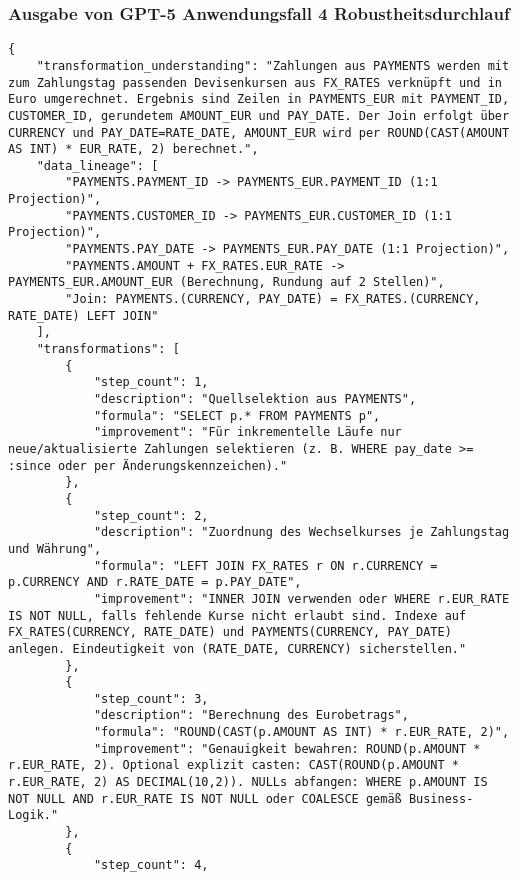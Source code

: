 \subsubsection{Ausgabe von GPT-5 Anwendungsfall 4 Robustheitsdurchlauf}\label{anhang:subsubsec:gpt_case4_prompt3}
\begin{lstlisting}[caption={Ausgabe: GPT-5 Anwendungsfall 4 Robustheitsdurchlauf},label={gpt_case4_prompt3}]
{
    "transformation_understanding": "Zahlungen aus PAYMENTS werden mit zum Zahlungstag passenden Devisenkursen aus FX_RATES verknüpft und in Euro umgerechnet. Ergebnis sind Zeilen in PAYMENTS_EUR mit PAYMENT_ID, CUSTOMER_ID, gerundetem AMOUNT_EUR und PAY_DATE. Der Join erfolgt über CURRENCY und PAY_DATE=RATE_DATE, AMOUNT_EUR wird per ROUND(CAST(AMOUNT AS INT) * EUR_RATE, 2) berechnet.",
    "data_lineage": [
        "PAYMENTS.PAYMENT_ID -> PAYMENTS_EUR.PAYMENT_ID (1:1 Projection)",
        "PAYMENTS.CUSTOMER_ID -> PAYMENTS_EUR.CUSTOMER_ID (1:1 Projection)",
        "PAYMENTS.PAY_DATE -> PAYMENTS_EUR.PAY_DATE (1:1 Projection)",
        "PAYMENTS.AMOUNT + FX_RATES.EUR_RATE -> PAYMENTS_EUR.AMOUNT_EUR (Berechnung, Rundung auf 2 Stellen)",
        "Join: PAYMENTS.(CURRENCY, PAY_DATE) = FX_RATES.(CURRENCY, RATE_DATE) LEFT JOIN"
    ],
    "transformations": [
        {
            "step_count": 1,
            "description": "Quellselektion aus PAYMENTS",
            "formula": "SELECT p.* FROM PAYMENTS p",
            "improvement": "Für inkrementelle Läufe nur neue/aktualisierte Zahlungen selektieren (z. B. WHERE pay_date >= :since oder per Änderungskennzeichen)."
        },
        {
            "step_count": 2,
            "description": "Zuordnung des Wechselkurses je Zahlungstag und Währung",
            "formula": "LEFT JOIN FX_RATES r ON r.CURRENCY = p.CURRENCY AND r.RATE_DATE = p.PAY_DATE",
            "improvement": "INNER JOIN verwenden oder WHERE r.EUR_RATE IS NOT NULL, falls fehlende Kurse nicht erlaubt sind. Indexe auf FX_RATES(CURRENCY, RATE_DATE) und PAYMENTS(CURRENCY, PAY_DATE) anlegen. Eindeutigkeit von (RATE_DATE, CURRENCY) sicherstellen."
        },
        {
            "step_count": 3,
            "description": "Berechnung des Eurobetrags",
            "formula": "ROUND(CAST(p.AMOUNT AS INT) * r.EUR_RATE, 2)",
            "improvement": "Genauigkeit bewahren: ROUND(p.AMOUNT * r.EUR_RATE, 2). Optional explizit casten: CAST(ROUND(p.AMOUNT * r.EUR_RATE, 2) AS DECIMAL(10,2)). NULLs abfangen: WHERE p.AMOUNT IS NOT NULL AND r.EUR_RATE IS NOT NULL oder COALESCE gemäß Business-Logik."
        },
        {
            "step_count": 4,

\end{lstlisting}
